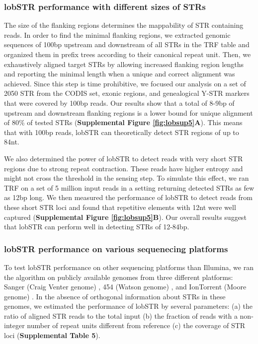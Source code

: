 \subsubsection{lobSTR performance with different sizes of STRs}
The size of the flanking regions determines the mappability of STR containing reads. In order to find the minimal flanking regions, we extracted genomic sequences of 100bp upstream and downstream of all STRs in the TRF table and organized them in prefix trees according to their canonical repeat unit. Then, we exhaustively aligned target STRs by allowing increased flanking region lengths and reporting the minimal length when a unique and correct alignment was achieved. Since this step is time prohibitive, we focused our analysis on a set of 2050 STR from the CODIS set, exonic regions, and genealogical Y-STR markers that were covered by 100bp reads. Our results show that a total of 8-9bp of upstream and downstream flanking regions is a lower bound for unique alignment of 80\% of tested STRs (\textbf{Supplemental Figure \ref{fig:lobsup5}A}). This means that with 100bp reads, lobSTR can theoretically detect STR regions of up to 84nt.  

We also determined the power of lobSTR to detect reads with very short STR regions due to strong repeat contraction. These reads have higher entropy and might not cross the threshold in the sensing step. To simulate this effect, we ran TRF on a set of 5 million input reads in a setting returning detected STRs as few as 12bp long. We then measured the performance of lobSTR to detect reads from these short STR loci and found that repetitive elements with 12nt were well captured (\textbf{Supplemental Figure \ref{fig:lobsup5}B}). Our overall results suggest that lobSTR can perform well in detecting STRs of 12-84bp. 

\subsubsection{lobSTR performance on various sequenecing platforms}
To test lobSTR performance on other sequencing platforms than Illumina, we ran the algorithm on publicly available genomes from three different platforms: Sanger (Craig Venter genome) \cite{LevySuttonNgEtAl2007}, 454 (Watson genome) \cite{WheelerSrinivasanEgholmEtAl2008}, and IonTorrent (Moore genome) \cite{RothbergHinzRearickEtAl2011}. In the absence of orthogonal information about STRs in these genomes, we estimated the performance of lobSTR by several parameters: (a) the ratio of aligned STR reads to the total input (b) the fraction of reads with a non-integer number of repeat units different from reference (c) the coverage of STR loci (\textbf{Supplemental Table 5}).

